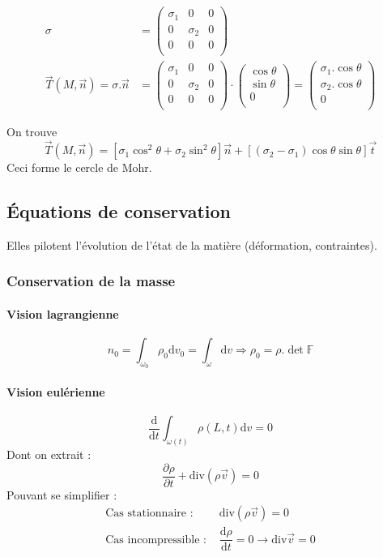 \documentclass{article}
\newcommand{\deriv}{\mathrm{d}}
\begin{document}
\begin{enumerate}
\begin{align*}
\sigma & =
\begin{pmatrix}
\sigma_1 & 0 & 0\\
0 & \sigma_2 & 0\\
0 & 0 & 0\\
\end{pmatrix}\\
\vec{T}(M,\vec{n}) = \sigma.\vec{n} & =
\begin{pmatrix}
\sigma_1 & 0 & 0\\
0 & \sigma_2 & 0\\
0 & 0 & 0\\
\end{pmatrix}
\cdot
\begin{pmatrix}
\cos \theta\\
\sin \theta\\
0\\
\end{pmatrix}
=
\begin{pmatrix}
\sigma_1 . \cos \theta\\
\sigma_2 . \cos \theta\\
0\\
\end{pmatrix}
\end{align*}

On trouve
\[\vec{T}(M,\vec{n}) = [\sigma_1 \cos^2 \theta + \sigma_2 \sin^2 \theta] \vec{n} + [(\sigma_2-\sigma_1)\cos \theta \sin \theta]\vec{t}\]
Ceci forme le cercle de Mohr.

\end{enumerate}


\subsection{Équations de conservation}
Elles pilotent l'évolution de l'état de la matière (déformation, contraintes).

\subsubsection{Conservation de la masse}
\paragraph{Vision lagrangienne}
\[n_0 = \int_{\omega_0} \rho_0 \deriv v_0 = \int_{\omega} \deriv v\Rightarrow \rho_0 = \rho. \det \mathbb{F}\]

\paragraph{Vision eulérienne}
\[\dfrac{\deriv}{\deriv t} \int_{\omega(t)} \rho (L,t) \deriv v = 0\]
Dont on extrait :
\[\dfrac{\partial \rho}{\partial t}+\text{div} (\rho \vec{v}) = 0\]
Pouvant se simplifier :
\begin{align*}
\text{Cas stationnaire : }& \text{div} (\rho \vec{v}) = 0\\
\text{Cas incompressible : }& \dfrac{\deriv \rho}{\deriv t} = 0 \to \text{div} \vec{v} = 0\\
\end{align*}
\end{document}
